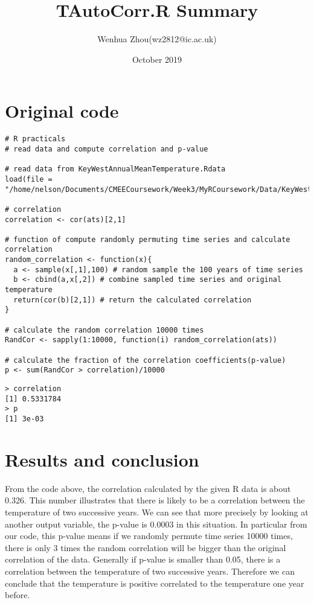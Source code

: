 \documentclass{article}
\title{TAutoCorr.R Summary}
\author{Wenhua Zhou(wz2812@ic.ac.uk)}
\date{October 2019}
\begin{document}
\maketitle

\section{Original code}
\begin{lstlisting}[caption=Source code for TAutoCorr.R(including comments)]
# R practicals
# read data and compute correlation and p-value

# read data from KeyWestAnnualMeanTemperature.Rdata
load(file = "/home/nelson/Documents/CMEECoursework/Week3/MyRCoursework/Data/KeyWestAnnualMeanTemperature.RData")

# correlation
correlation <- cor(ats)[2,1]

# function of compute randomly permuting time series and calculate correlation
random_correlation <- function(x){
  a <- sample(x[,1],100) # random sample the 100 years of time series
  b <- cbind(a,x[,2]) # combine sampled time series and original temperature
  return(cor(b)[2,1]) # return the calculated correlation
}

# calculate the random correlation 10000 times
RandCor <- sapply(1:10000, function(i) random_correlation(ats)) 

# calculate the fraction of the correlation coefficients(p-value)
p <- sum(RandCor > correlation)/10000
\end{lstlisting}

\begin{lstlisting}
> correlation
[1] 0.5331784
> p
[1] 3e-03
\end{lstlisting}

\section{Results and conclusion}
From the code above, the correlation calculated by the given R data is about 0.326. This number illustrates that there is likely to be a correlation between the temperature of two successive years. We can see that more precisely by looking at another output variable, the p-value is 0.0003 in this situation. In particular from our code, this p-value means if we randomly permute time series 10000 times, there is only 3 times the random correlation will be bigger than the original correlation of the data. Generally if p-value is smaller than 0.05, there is a correlation between the temperature of two successive years. Therefore we can conclude that the temperature is positive correlated to the temperature one year before.
\end{document}
